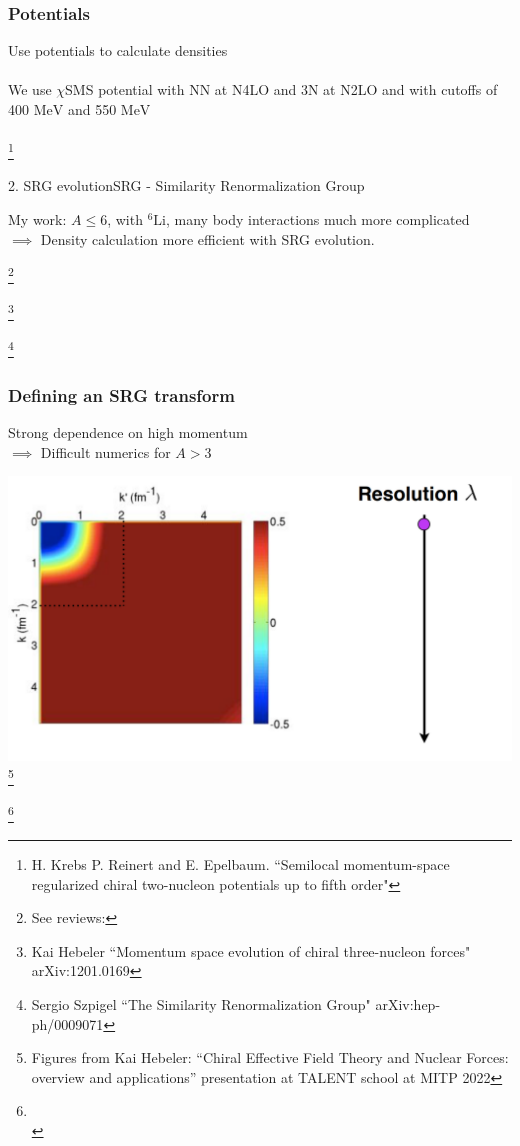 \documentclass{beamer}
\newcommand{\LiS}{{}^{6} \mathrm{Li} }
\newcommand\footn[1]{%
  \begingroup
  \renewcommand\thefootnote{}\footnote{#1}%
  \addtocounter{footnote}{-1}%
  \endgroup
}
\begin{document}
\begin{frame}\frametitle{Potentials}
Use potentials to calculate densities\\~\\
We use $\chi$SMS potential  with NN at N4LO and 3N at N2LO and with cutoffs of 400 $\mathrm{MeV}$ and 550 $\mathrm{MeV}$\\~\\
\footn{H. Krebs P. Reinert and E. Epelbaum. “Semilocal momentum-space regularized chiral two-nucleon potentials up to fifth order"}
\end{frame}






\begin{frame}{2. SRG evolution}{SRG - Similarity Renormalization Group}
\begin{center}
    
My work: $A\leq6$, with $\LiS$, many body interactions much more complicated\\ $\implies$ Density calculation more efficient with SRG evolution.
\end{center}
\footn{See reviews:}
\footn{ Kai Hebeler ``Momentum space evolution of chiral three-nucleon forces" arXiv:1201.0169}
\footn{Sergio Szpigel ``The Similarity Renormalization Group" arXiv:hep-ph/0009071}
\end{frame}




\begin{frame}\frametitle{Defining an SRG transform}
\begin{center}
Strong dependence on high momentum\\  $\implies$ Difficult numerics for $A>3$\\
\end{center}
\includegraphics[scale=0.35]{LowRes.png}
\footn{Figures from Kai Hebeler: ``Chiral Effective Field Theory and Nuclear Forces:
overview and applications'' presentation at TALENT school at MITP 2022}
\footn{~\\}
\end{frame}
\end{document}
